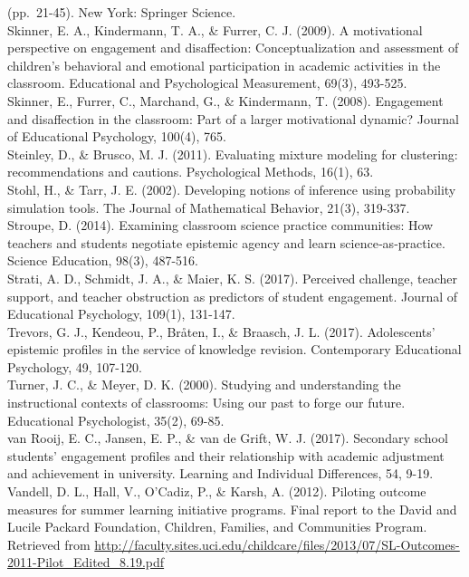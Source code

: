 \documentclass[]{msu-thesis}
\theoremstyle{definition}
\theoremstyle{definition}
\theoremstyle{definition}
\theoremstyle{remark}
\begin{document}
(pp.~21-45). New York: Springer Science.\\
Skinner, E. A., Kindermann, T. A., \& Furrer, C. J. (2009). A
motivational perspective on engagement and disaffection:
Conceptualization and assessment of children's behavioral and emotional
participation in academic activities in the classroom. Educational and
Psychological Measurement, 69(3), 493-525.\\
Skinner, E., Furrer, C., Marchand, G., \& Kindermann, T. (2008).
Engagement and disaffection in the classroom: Part of a larger
motivational dynamic? Journal of Educational Psychology, 100(4), 765.\\
Steinley, D., \& Brusco, M. J. (2011). Evaluating mixture modeling for
clustering: recommendations and cautions. Psychological Methods, 16(1),
63.\\
Stohl, H., \& Tarr, J. E. (2002). Developing notions of inference using
probability simulation tools. The Journal of Mathematical Behavior,
21(3), 319-337.\\
Stroupe, D. (2014). Examining classroom science practice communities:
How teachers and students negotiate epistemic agency and learn
science‐as‐practice. Science Education, 98(3), 487-516.\\
Strati, A. D., Schmidt, J. A., \& Maier, K. S. (2017). Perceived
challenge, teacher support, and teacher obstruction as predictors of
student engagement. Journal of Educational Psychology, 109(1),
131-147.\\
Trevors, G. J., Kendeou, P., Bråten, I., \& Braasch, J. L. (2017).
Adolescents' epistemic profiles in the service of knowledge revision.
Contemporary Educational Psychology, 49, 107-120.\\
Turner, J. C., \& Meyer, D. K. (2000). Studying and understanding the
instructional contexts of classrooms: Using our past to forge our
future. Educational Psychologist, 35(2), 69-85.\\
van Rooij, E. C., Jansen, E. P., \& van de Grift, W. J. (2017).
Secondary school students' engagement profiles and their relationship
with academic adjustment and achievement in university. Learning and
Individual Differences, 54, 9-19.\\
Vandell, D. L., Hall, V., O'Cadiz, P., \& Karsh, A. (2012). Piloting
outcome measures for summer learning initiative programs. Final report
to the David and Lucile Packard Foundation, Children, Families, and
Communities Program. Retrieved from
\url{http://faculty.sites.uci.edu/childcare/files/2013/07/SL-Outcomes-2011-Pilot_Edited_8.19.pdf}\\
\end{document}
